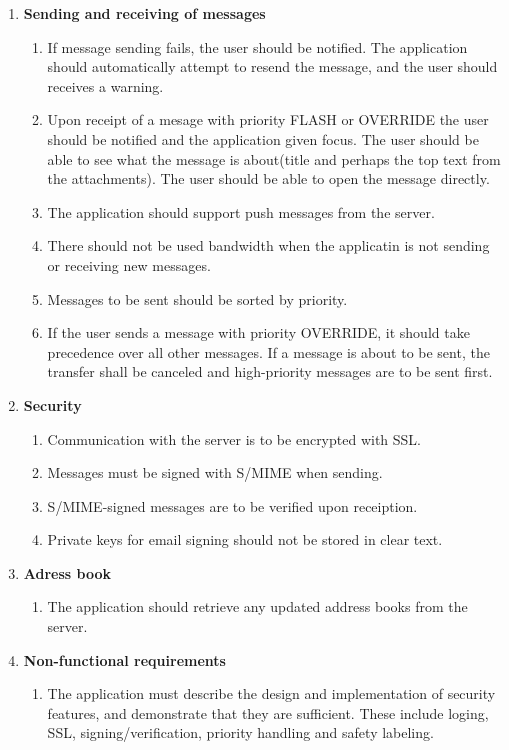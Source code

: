 \begin{enumerate}
\begin{enumerate}
\end{enumerate}
\item{}\textbf{Sending and receiving of messages}
\begin{enumerate}
\item{}If message sending fails, the user should be notified. The application should automatically attempt to resend the message, and the user should receives a warning.
\item{}Upon receipt of a mesage with priority FLASH or OVERRIDE the user should be notified and the application given focus. The user should be able to see what the message is about(title and perhaps the top text from the attachments). The user should be able to open the message directly.
\item{}The application should support push messages from the server.
\item{}There should not be used bandwidth when the applicatin is not sending or receiving new messages.
\item{}Messages to be sent should be sorted by priority.
\item{}If the user sends a message with priority OVERRIDE, it should take precedence over all other messages. If a message is about to be sent, the transfer shall be canceled and high-priority messages are to be sent first.
\end{enumerate}
\item{}\textbf{Security}
\begin{enumerate}
\item{}Communication with the server is to be encrypted with SSL.
\item{}Messages must be signed with S/MIME when sending.
\item{}S/MIME-signed messages are to be verified upon receiption.
\item{}Private keys for email signing should not be stored in clear text.
\end{enumerate}
\item{}\textbf{Adress book}
\begin{enumerate}
\item{}The application should retrieve any updated address books from the server.
\end{enumerate}
\item{}\textbf{Non-functional requirements}
\begin{enumerate}
\item{}The application must describe the design and implementation of security features, and demonstrate that they are sufficient. These include loging, SSL, signing/verification, priority handling and safety labeling.
\end{enumerate}
\end{enumerate}